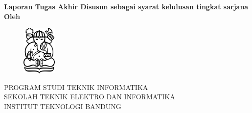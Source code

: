 \clearpage
\pagestyle{empty}

\begin{center}
\smallskip
    \Large \bfseries \MakeUppercase{\thetitle}
    \vfill
    \Large Laporan Tugas Akhir
    \vfill
    \large Disusun sebagai syarat kelulusan tingkat sarjana
    \vfill
    \large Oleh
    \Large \uppercase{\theauthor}
    \vfill
    \begin{figure}[h]
        \centering
      	\includegraphics[width=0.15\textwidth]{images/itb-logo}
    \end{figure}
    \vfill
    \large
    \uppercase{
        Program Studi Teknik Informatika \\
        Sekolah Teknik Elektro dan Informatika \\
        Institut Teknologi Bandung
    }

    \thedate
\end{center}
\clearpage
